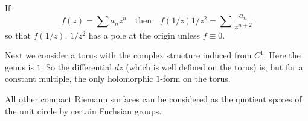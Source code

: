 If
$$
f(z)=\sum a_{n}z^{n}\quad\text{then}\quad f(1/z)1/z^{2}=\sum
\frac{a_{n}}{z^{n+2}}
$$
so that $f(1/z)$. $1/z^{2}$ has a pole at the origin unless $f\equiv
0$.

Next we consider a torus with the complex structure induced from
$C^{1}$. Here the genus is $1$. So the differential $dz$ (which is
well defined on the torus) is, but for a constant multiple, the only
holomorphic $1$-form on the torus.

All other compact Riemann surfaces can be considered as the quotient
spaces of the unit circle by certain Fuchsian groups.


